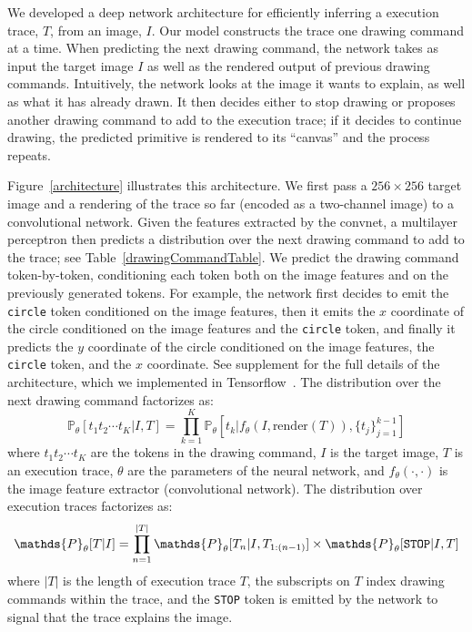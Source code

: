 \documentclass{article}
\newcommand{\probability}{\mathds{P}} %
\newcommand{\remark}[1]{\textcolor{red}{[#1]}}
\begin{document}
We developed a deep network architecture for efficiently inferring a
execution trace, $T$, from an image, $I$.  Our model constructs the
trace one drawing command at a time.  When predicting the next drawing
command, the network takes as input the target image $I$ as well as
the rendered output of previous drawing commands.  Intuitively, the
network looks at the image it wants to explain, as well as what it has
already drawn.  It then decides either to stop drawing or proposes
another drawing command to add to the execution trace; if it decides
to continue drawing, the predicted primitive is rendered to its
``canvas'' and the process repeats.

Figure~\ref{architecture} illustrates this architecture.  We first
pass a $256\times 256$ target image and a rendering of the trace so
far (encoded as a two-channel image) to a convolutional network. Given the features extracted by the
convnet, a multilayer perceptron then predicts a distribution over the
next drawing command to add to the trace; see Table~\ref{drawingCommandTable}.  We predict the drawing
command token-by-token, conditioning each token both on the image
features and on the previously generated tokens.  For example, the
network first decides to emit the \verb|circle| token conditioned on
the image features, then it emits the $x$ coordinate of the circle
conditioned on the image features and the \verb|circle| token, and
finally it predicts the $y$ coordinate of the circle conditioned on
the image features, the \verb|circle| token, and the $x$ coordinate.
See supplement for the full details of the architecture,
which we implemented in Tensorflow~\cite{tensorflow2015-whitepaper}.
The distribution over the next drawing command factorizes as:
\begin{equation}
  \probability_\theta [t_1t_2\cdots t_K | I,T] = \prod_{k = 1}^K \probability_\theta [t_k | f_\theta(I,\text{render}(T)), \{t_j\}_{j = 1}^{k - 1}]
\end{equation}
where $t_1t_2\cdots t_K$ are the tokens in the drawing command, $I$ is
the target image, $T$ is an execution trace, $\theta$ are the
parameters of the neural network, and $f_\theta(\cdot,\cdot)$ is the
image feature extractor (convolutional network). The distribution over
execution traces factorizes as:
\begin{equation}
  \probability_\theta [T|I] = \prod_{n = 1}^{|T|} \probability_\theta [T_n | I,T_{1:(n-1)}]\times\probability_\theta [\verb|STOP| | I,T]\label{objective}
\end{equation}
where $|T|$ is the length of execution trace $T$, the subscripts
on $T$ index drawing commands within the trace, and the \verb|STOP|
token is emitted by the network to signal that the trace
explains the image.
\end{document}
